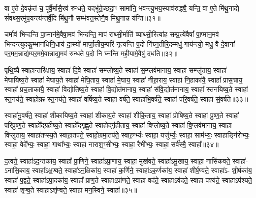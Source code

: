 वा ए॒ते दे॒वकृ॑तं च॒ पूर्वै॒र्मासै॒रव॑ रुन्धते॒ यद्भू॑ते॒च्छदा॒ꣳ॒ सामा॑नि॒ भव॑न्त्यु॒भय॒स्याव॑रुद्ध्यै॒ यन्ति॒ वा ए॒ते मि॑थु॒नाद्ये सं॑वथ्स॒रमु॑प॒यन्त्य॑न्तर्वे॒दि मि॑थु॒नौ सम्भ॑वत॒स्तेनै॒व मि॑थु॒नान्न य॑न्ति॥३१॥

{\anuvakamend[{व्यृ॑द्ध॒मक्षो॑धुका॒स्ताꣳ समां᳚ प्र॒जाः प॑र॒मामे॒व च॑ त्रि॒ꣳ॒शच्च॑॥९॥}]}

चर्माव॑ भिन्दन्ति पा॒प्मान॑मे॒वैषा॒मव॑ भिन्दन्ति॒ माप॑ राथ्सी॒र्माति॑ व्याथ्सी॒रित्या॑ह सम्प्र॒त्ये॑वैषां᳚ पा॒प्मान॒मव॑ भिन्दन्त्युदकु॒म्भान॑धिनि॒धाय॑ दा॒स्यो॑ मार्जा॒लीय॒म्परि॑ नृत्यन्ति प॒दो नि॑घ्न॒तीरि॒दम्म॑धुं॒ गाय॑न्त्यो॒ मधु॒ वै दे॒वानां᳚ पर॒मम॒न्नाद्य॑म्पर॒ममे॒वान्नाद्य॒मव॑ रुन्धते प॒दो नि घ्न॑न्ति मही॒यामे॒वैषु॑ दधति॥३२॥

{\anuvakamend[{चर्मैका॒न्नप॑ञ्चा॒शत्॥10॥}]}

पृ॒थि॒व्यै स्वाहा॒न्तरि॑क्षाय॒ स्वाहा॑ दि॒वे स्वाहा॑ सम्प्लोष्य॒ते स्वाहा॑ स॒म्प्लव॑मानाय॒ स्वाहा॒ सम्प्लु॑ताय॒ स्वाहा॑ मेघायिष्य॒ते स्वाहा॑ मेघाय॒ते स्वाहा॑ मेघि॒ताय॒ स्वाहा॑ मे॒घाय॒ स्वाहा॑ नीहा॒राय॒ स्वाहा॑ नि॒हाका॑यै॒ स्वाहा᳚ प्रास॒चाय॒ स्वाहा᳚ प्रच॒लाका॑यै॒ स्वाहा॑ विद्योतिष्य॒ते स्वाहा॑ वि॒द्योत॑मानाय॒ स्वाहा॑ संवि॒द्योत॑मानाय॒ स्वाहा᳚ स्तनयिष्य॒ते स्वाहा᳚ स्त॒नय॑ते॒ स्वाहो॒ग्रꣴ स्त॒नय॑ते॒ स्वाहा॑ वर्\mbox{}षिष्य॒ते स्वाहा॒ वर्\mbox{}ष॑ते॒ स्वाहा॑भि॒वर्\mbox{}ष॑ते॒ स्वाहा॑ परि॒वर्\mbox{}ष॑ते॒ स्वाहा॑ सं॒वर्\mbox{}ष॑ते॥३३॥

स्वाहा॑नु॒वर्\mbox{}ष॑ते॒ स्वाहा॑ शीकायिष्य॒ते स्वाहा॑ शीकाय॒ते स्वाहा॑ शीकि॒ताय॒ स्वाहा᳚ प्रोषिष्य॒ते स्वाहा᳚ प्रुष्ण॒ते स्वाहा॑ परिप्रुष्ण॒ते स्वाहो᳚द्ग्रहीष्य॒ते स्वाहो᳚द्गृह्ण॒ते स्वाहोद्गृ॑हीताय॒ स्वाहा॑ विप्लोष्य॒ते स्वाहा॑ वि॒प्लव॑मानाय॒ स्वाहा॒ विप्लु॑ताय॒ स्वाहा॑तप्स्य॒ते स्वाहा॒तप॑ते॒ स्वाहो॒ग्रमा॒तप॑ते॒ स्वाह॒र्ग्भ्यः स्वाहा॒ यजु॑र्भ्यः॒ स्वाहा॒ साम॑भ्यः॒ स्वाहाङ्गि॑रोभ्यः॒ स्वाहा॒ वेदे᳚भ्यः॒ स्वाहा॒ गाथा᳚भ्यः॒ स्वाहा॑ नाराश॒ꣳ॒सीभ्यः॒ स्वाहा॒ रैभी᳚भ्यः॒ स्वाहा॒ सर्व॑स्मै॒ स्वाहा᳚॥३४॥

{\anuvakamend[{सं॒ वर्\mbox{}ष॑ते॒ रैभी᳚भ्यः॒ स्वाहा॒ द्वे च॑॥11॥}]}

द॒त्वते॒ स्वाहा॑\-ऽद॒न्तका॑य॒ स्वाहा᳚ प्रा॒णिने॒ स्वाहा᳚\-ऽप्रा॒णाय॒ स्वाहा॒ मुख॑वते॒ स्वाहा॑\-ऽमु॒खाय॒ स्वाहा॒ नासि॑कवते॒ स्वाहा॑- \-ऽनासि॒काय॒ स्वाहा᳚\-ऽक्ष॒ण्वते॒ स्वाहा॑\-ऽन॒क्षिका॑य॒ स्वाहा॑ क॒र्णिने॒ स्वाहा॑\-ऽक॒र्णका॑य॒ स्वाहा॑ शीर्\mbox{}ष॒ण्वते॒ स्वाहा॑\-ऽ- शी॒र्\mbox{}षका॑य॒ स्वाहा॑ प॒द्वते॒ स्वाहा॑\-ऽपा॒दका॑य॒ स्वाहा᳚ प्राण॒ते स्वाहा\-ऽप्रा॑णते॒ स्वाहा॒ वद॑ते॒ स्वाहा\-ऽव॑दते॒ स्वाहा॒ पश्य॑ते॒ स्वाहा\-ऽप॑श्यते॒ स्वाहा॑ शृण्व॒ते स्वाहा\-ऽशृ॑ण्वते॒ स्वाहा॑ मन॒स्विने॒ स्वाहा᳚॥३५॥

